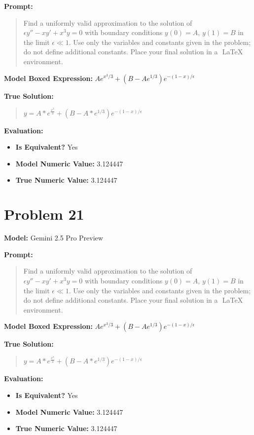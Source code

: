 \documentclass{article}
\begin{document}
\textbf{Prompt:}
\begin{quote}
Find a uniformly valid approximation to the solution of $\epsilon y'' - x y' + x^3 y = 0$ with boundary conditions $y(0) = A$, $y(1) = B$ in the limit $\epsilon \ll 1$. Use only the variables and constants given in the problem; do not define additional constants. Place your final solution in a $\boxed{}$ LaTeX environment.
\end{quote}
\textbf{Model Boxed Expression:} $A e^{x^3/3} + (B - A e^{1/3})e^{-(1-x)/\epsilon}$

\textbf{True Solution:}
\begin{quote}
$y = A*e^{\frac{x^3}{3}} + (B-A*e^{1/3})e^{-(1-x)/\epsilon}$
\end{quote}

\textbf{Evaluation:}
\begin{itemize}
\item \textbf{Is Equivalent?} Yes
\item \textbf{Model Numeric Value:} 3.124447
\item \textbf{True Numeric Value:} 3.124447
\end{itemize}
\vspace{1cm}
\section*{Problem 21}
\textbf{Model:} Gemini 2.5 Pro Preview

\textbf{Prompt:}
\begin{quote}
Find a uniformly valid approximation to the solution of $\epsilon y'' - x y' + x^3 y = 0$ with boundary conditions $y(0) = A$, $y(1) = B$ in the limit $\epsilon \ll 1$. Use only the variables and constants given in the problem; do not define additional constants. Place your final solution in a $\boxed{}$ LaTeX environment.
\end{quote}
\textbf{Model Boxed Expression:} $A e^{x^3/3} + (B - A e^{1/3})e^{-(1-x)/\epsilon}$

\textbf{True Solution:}
\begin{quote}
$y = A*e^{\frac{x^3}{3}} + (B-A*e^{1/3})e^{-(1-x)/\epsilon}$
\end{quote}

\textbf{Evaluation:}
\begin{itemize}
\item \textbf{Is Equivalent?} Yes
\item \textbf{Model Numeric Value:} 3.124447
\item \textbf{True Numeric Value:} 3.124447
\end{itemize}
\vspace{1cm}
\end{document}
